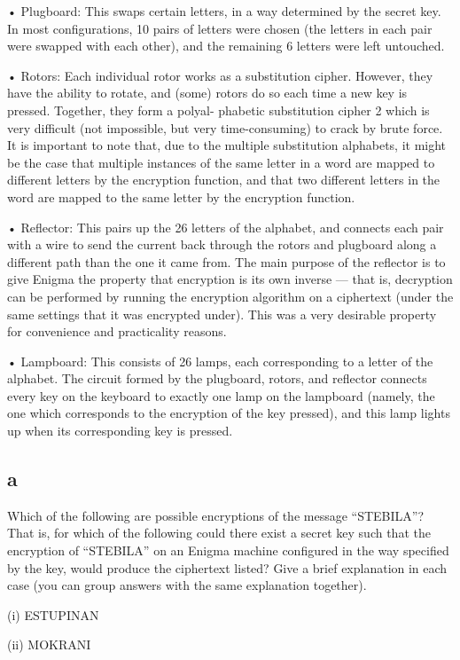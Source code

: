 \documentclass[11pt]{article}
\begin{document}
• Plugboard: This swaps certain letters, in a way determined by the secret key. In most conﬁgurations, 10 pairs of letters were chosen (the letters in each pair were swapped with each other), and the remaining 6 letters were left untouched.

• Rotors: Each individual rotor works as a substitution cipher. However, they have the ability to rotate, and (some) rotors do so each time a new key is pressed. Together, they form a polyal- phabetic substitution cipher 2 which is very diﬃcult (not impossible, but very time-consuming) to crack by brute force. It is important to note that, due to the multiple substitution alphabets, it might be the case that multiple instances of the same letter in a word are mapped to diﬀerent letters by the encryption function, and that two diﬀerent letters in the word are mapped to the same letter by the encryption function.

• Reﬂector: This pairs up the 26 letters of the alphabet, and connects each pair with a wire to send the current back through the rotors and plugboard along a diﬀerent path than the one it came from. The main purpose of the reﬂector is to give Enigma the property that encryption is its own inverse — that is, decryption can be performed by running the encryption algorithm on a ciphertext (under the same settings that it was encrypted under). This was a very desirable property for convenience and practicality reasons.

• Lampboard: This consists of 26 lamps, each corresponding to a letter of the alphabet. The circuit formed by the plugboard, rotors, and reﬂector connects every key on the keyboard to exactly one lamp on the lampboard (namely, the one which corresponds to the encryption of the key pressed), and this lamp lights up when its corresponding key is pressed.

\subsection{a} Which of the following are possible encryptions of the message “STEBILA”? That is, for which of the following could there exist a secret key such that the encryption of “STEBILA” on an Enigma machine conﬁgured in the way speciﬁed by the key, would produce the ciphertext listed? Give a brief explanation in each case (you can group answers with the same explanation together).

(i) ESTUPINAN

(ii) MOKRANI
\end{document}
